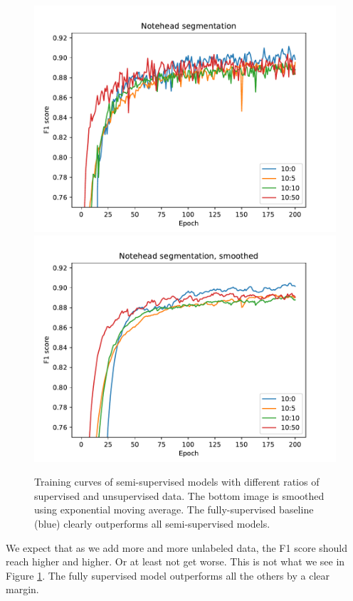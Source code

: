 \begin{figure}[p]
    \centering
    \includegraphics[width=140mm]{../../figures/01-exploration-noteheads/noteheads-dropout.pdf}
    \includegraphics[width=140mm]{../../figures/01-exploration-noteheads/noteheads-dropout-smooth.pdf}
    \caption{Training curves of semi-supervised models with different ratios of supervised and unsupervised data. The bottom image is smoothed using exponential moving average. The fully-supervised baseline (blue) clearly outperforms all semi-supervised models.}
    \label{fig:ExplorationNoteheads}
\end{figure}

We expect that as we add more and more unlabeled data, the F1 score should reach higher and higher. Or at least not get worse. This is not what we see in Figure \ref{fig:ExplorationNoteheads}. The fully supervised model outperforms all the others by a clear margin.

